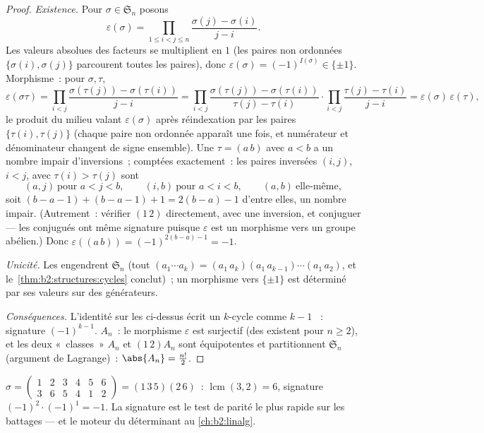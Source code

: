 \begin{proof}
\emph{Existence.} Pour $\sigma \in \mathfrak{S}_n$ posons
\[
\varepsilon(\sigma)
= \prod_{1 \leq i < j \leq n}
\frac{\sigma(j) - \sigma(i)}{j - i} .
\]
Les valeurs absolues des facteurs se multiplient en $1$ (les paires
non ordonnées $\{\sigma(i), \sigma(j)\}$ parcourent toutes les
paires), donc $\varepsilon(\sigma) = (-1)^{I(\sigma)} \in \{\pm1\}$.
Morphisme~: pour $\sigma, \tau$,
\[
\varepsilon(\sigma\tau)
= \prod_{i<j} \frac{\sigma(\tau(j)) - \sigma(\tau(i))}{j - i}
= \prod_{i<j} \frac{\sigma(\tau(j)) - \sigma(\tau(i))}{\tau(j) -
\tau(i)} \cdot \prod_{i<j} \frac{\tau(j) - \tau(i)}{j - i}
= \varepsilon(\sigma)\,\varepsilon(\tau),
\]
le produit du milieu valant $\varepsilon(\sigma)$ après réindexation
par les paires $\{\tau(i), \tau(j)\}$ (chaque paire non ordonnée
apparaît une fois, et numérateur et dénominateur changent de signe
ensemble). Une  $\tau = (a\,b)$ avec $a < b$ a un nombre
impair d'inversions~; comptées exactement~: les paires inversées $(i,
j)$, $i < j$, avec $\tau(i) > \tau(j)$ sont
\[
(a, j) \ \text{pour } a < j < b, \qquad
(i, b) \ \text{pour } a < i < b, \qquad
(a, b) \ \text{elle-même},
\]
soit $(b - a - 1) + (b - a - 1) + 1 = 2(b - a) - 1$ d'entre elles,
un nombre impair. (Autrement~: vérifier $(1\,2)$ directement, avec
une inversion, et conjuguer --- les conjugués ont même signature
puisque $\varepsilon$ est un morphisme vers un groupe abélien.) Donc
$\varepsilon((a\,b)) = (-1)^{2(b-a)-1} = -1$.

\emph{Unicité.} Les  engendrent $\mathfrak{S}_n$ (tout
 $(a_1\cdots a_k) = (a_1\,a_k)(a_1\,a_{k-1})\cdots(a_1\,a_2)$,
et le~\cref{thm:b2:structures:cycles} conclut)~; un morphisme vers
$\{\pm1\}$ est déterminé par ses valeurs sur des générateurs.

\emph{Conséquences.} L'identité sur les  ci-dessus écrit un
$k$-cycle comme $k - 1$ ~: signature $(-1)^{k-1}$.
$A_n$~: le morphisme $\varepsilon$ est surjectif (des 
existent pour $n \geq 2$), et les deux «~classes~» $A_n$ et
$(1\,2)A_n$ sont équipotentes et partitionnent $\mathfrak{S}_n$
(argument de Lagrange)~: $\abs{A_n} = \frac{n!}{2}$.
\end{proof}

\begin{example}\label{ex:b2:structures:snexample}
$\sigma = \begin{pmatrix} 1&2&3&4&5&6\\ 3&6&5&4&1&2 \end{pmatrix}
= (1\,3\,5)(2\,6)$~:  $\operatorname{lcm}(3,2) = 6$, signature
$(-1)^{2}\cdot(-1)^{1} = -1$. La signature est le test de parité le
plus rapide sur les battages --- et le moteur du déterminant au
\cref{ch:b2:linalg}.
\end{example}

